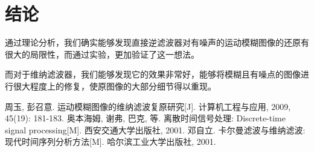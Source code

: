 \documentclass[11pt, a4paper]{article}
\begin{document}
\section{结论}

通过理论分析，我们确实能够发现直接逆滤波器对有噪声的运动模糊图像的还原有很大的局限性，而通过实验，更加验证了这一想法。

而对于维纳滤波器，我们能够发现它的效果非常好，能够将模糊且有噪点的图像进行很大程度上的修复，使原图像的大部分细节得以重现。

\renewcommand\refname{参考文献}
\begin{thebibliography}{99}
 周玉, 彭召意. 运动模糊图像的维纳滤波复原研究[J]. 计算机工程与应用, 2009, 45(19): 181-183.
 奥本海姆, 谢弗, 巴克, 等. 离散时间信号处理: Discrete-time signal processing[M]. 西安交通大学出版社, 2001.
 邓自立. 卡尔曼滤波与维纳滤波: 现代时间序列分析方法[M]. 哈尔滨工业大学出版社, 2001.

\end{thebibliography}
\end{document}

